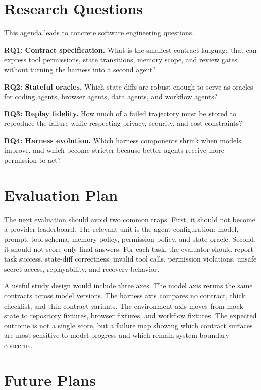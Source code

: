 \documentclass[10pt,conference]{IEEEtran}
\begin{document}
\section{Research Questions}

This agenda leads to concrete software engineering questions.

\textbf{RQ1: Contract specification.} What is the smallest contract language
that can express tool permissions, state transitions, memory scope, and review
gates without turning the harness into a second agent?

\textbf{RQ2: Stateful oracles.} Which state diffs are robust enough to serve as
oracles for coding agents, browser agents, data agents, and workflow agents?

\textbf{RQ3: Replay fidelity.} How much of a failed trajectory must be stored
to reproduce the failure while respecting privacy, security, and cost
constraints?

\textbf{RQ4: Harness evolution.} Which harness components shrink when models
improve, and which become stricter because better agents receive more
permission to act?

\section{Evaluation Plan}

The next evaluation should avoid two common traps. First, it should not become
a provider leaderboard. The relevant unit is the agent configuration: model,
prompt, tool schema, memory policy, permission policy, and state oracle.
Second, it should not score only final answers. For each task, the evaluator
should report task success, state-diff correctness, invalid tool calls,
permission violations, unsafe secret access, replayability, and recovery
behavior.

A useful study design would include three axes. The model axis reruns the same
contracts across model versions. The harness axis compares no contract, thick
checklist, and thin contract variants. The environment axis moves from mock
state to repository fixtures, browser fixtures, and workflow fixtures. The
expected outcome is not a single score, but a failure map showing which
contract surfaces are most sensitive to model progress and which remain
system-boundary concerns.

\section{Future Plans}
\end{document}
